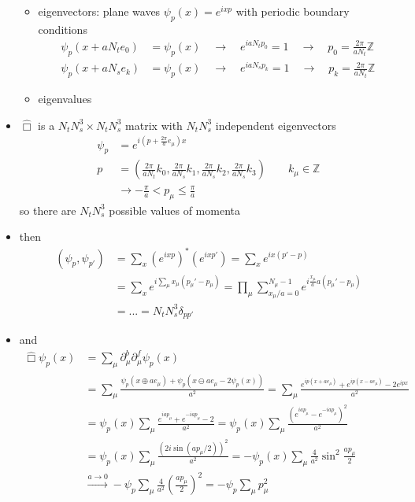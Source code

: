 \documentclass[10pt,a4paper]{article}
\theoremstyle{definition}
\begin{document}
\begin{itemize}
\begin{itemize}
\item eigenvectors: plane waves $\psi_p(x)=e^{ixp}$ with periodic boundary conditions
\begin{align}
\psi_p(x+aN_te_0)&=\psi_p(x)\quad\rightarrow\quad e^{iaN_tp_0}=1\quad\rightarrow\quad p_0=\frac{2\pi}{aN_t}\mathbb{Z}\\
\psi_p(x+aN_se_k)&=\psi_p(x)\quad\rightarrow\quad e^{iaN_sp_k}=1\quad\rightarrow\quad p_k=\frac{2\pi}{aN_t}\mathbb{Z}
\end{align}
\item eigenvalues
\end{itemize}
\item $\hat{\Box}$ is a $N_tN_s^3\times N_tN_s^3$ matrix with $N_tN_s^3$ independent eigenvectors
\begin{align}
\psi_p&=e^{i(p+\frac{2\pi}{a}e_\mu)x}\\
p&=\left(\frac{2\pi}{aN_t}k_0,\frac{2\pi}{aN_s}k_1,\frac{2\pi}{aN_s}k_2,\frac{2\pi}{aN_s}k_3\right)\qquad k_\mu\in\mathbb{Z}\\
&\rightarrow -\frac{\pi}{a}<p_\mu\le\frac{\pi}{a}
\end{align}
so there are $N_tN_s^3$ possible values of momenta
\item then
\begin{align}
(\psi_p,\psi_{p'})
&=\sum_x(e^{ixp})^*(e^{ixp'})
=\sum_xe^{ix(p'-p)}\\
&=\sum_xe^{i\sum_\mu x_\mu(p_\mu'-p_\mu)}
=\prod_\mu\sum_{x_\mu/a=0}^{N_\mu-1}e^{i \frac{x_\mu}{a}a(p_\mu'-p_\mu)}\\
&=...
=N_tN_s^3\delta_{pp'}
\end{align}
\item and
\begin{align}
\hat{\Box}\psi_p(x)
&=\sum_\mu\partial_\mu^b\partial_\mu^f\psi_p(x)\\
&=\sum_\mu\frac{\psi_p(x\oplus ae_\mu)+\psi_p(x\ominus ae_\mu-2\psi_p(x))}{a^2}
=\sum_\mu\frac{e^{ip(x+ae_\mu)}+e^{ip(x-ae_\mu)}-2e^{ipx}}{a^2}\\
&=\psi_p(x)\sum_\mu\frac{e^{iap_\mu}+e^{-iap_\mu}-2}{a^2}
=\psi_p(x)\sum_\mu\frac{(e^{iap_\mu}-e^{-iap_\mu})^2}{a^2}\\
&=\psi_p(x)\sum_\mu\frac{(2i\sin(ap_\mu/2))^2}{a^2}
=-\psi_p(x)\sum_\mu\frac{4}{a^2}\sin^2\frac{ap_\mu}{2}\\
&\overset{a\rightarrow0}{\rightarrow}-\psi_p\sum_\mu\frac{4}{a^2}\left(\frac{ap_\mu}{2}\right)^2
=-\psi_p\sum_\mu p_\mu^2
\end{align}

\end{itemize}
\end{document}
